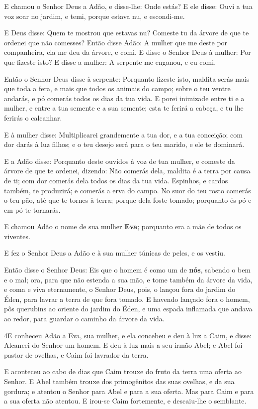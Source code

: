E chamou o Senhor Deus a Adão, e disse-lhe: Onde estás? E
ele disse: Ouvi a tua voz soar no jardim, e temi, porque estava nu,
e escondi-me.

E Deus disse: Quem te mostrou que estavas nu? Comeste tu da
árvore de que te ordenei que não comesses? Então disse Adão:
A mulher que me deste por companheira, ela me deu da árvore, e comi.
E disse o Senhor Deus à mulher: Por que fizeste isto? E disse
a mulher: A serpente me enganou, e eu comi.

Então o Senhor Deus disse à serpente: Porquanto fizeste isto,
maldita serás mais que toda a fera, e mais que todos os animais do
campo; sobre o teu ventre andarás, e pó comerás todos os dias da tua
vida. E porei inimizade entre ti e a mulher, e entre a tua
semente e a sua semente; esta te ferirá a cabeça, e tu lhe ferirás o
calcanhar.

E à mulher disse: Multiplicarei grandemente a tua dor, e a tua
conceição; com dor darás à luz filhos; e o teu desejo será para o
teu marido, e ele te dominará.

E a Adão disse: Porquanto deste ouvidos à voz de tua mulher, e
comeste da árvore de que te ordenei, dizendo: Não comerás dela,
maldita é a terra por causa de ti; com dor comerás dela todos os
dias da tua vida. Espinhos, e cardos também, te produzirá; e
comerás a erva do campo. No suor do teu rosto comerás o teu
pão, até que te tornes à terra; porque dela foste tomado; porquanto
és pó e em pó te tornarás.

E chamou Adão o nome de sua mulher \textbf{Eva}; porquanto era a
mãe de todos os viventes.

E fez o Senhor Deus a Adão e à sua mulher túnicas de peles, e os
vestiu.

Então disse o Senhor Deus: Eis que o homem é como um de
\textbf{nós}, sabendo o bem e o mal; ora, para que não estenda a sua
mão, e tome também da árvore da vida, e coma e viva eternamente,
o Senhor Deus, pois, o lançou fora do jardim do Éden, para
lavrar a terra de que fora tomado. E havendo lançado fora o
homem, pôs querubins ao oriente do jardim do Éden, e uma espada
inflamada que andava ao redor, para guardar o caminho da árvore da
vida.

\smallskip

\lettrine{4} E conheceu Adão a Eva, sua mulher, e ela concebeu
e deu à luz a Caim, e disse: Alcancei do Senhor um homem. E deu
à luz mais a seu irmão Abel; e Abel foi pastor de ovelhas, e Caim
foi lavrador da terra.

E aconteceu ao cabo de dias que Caim trouxe do fruto da terra uma
oferta ao Senhor. E Abel também trouxe dos primogênitos das suas
ovelhas, e da sua gordura; e atentou o Senhor para Abel e para a sua
oferta. Mas para Caim e para a sua oferta não atentou. E irou-se
Caim fortemente, e descaiu-lhe o semblante.

